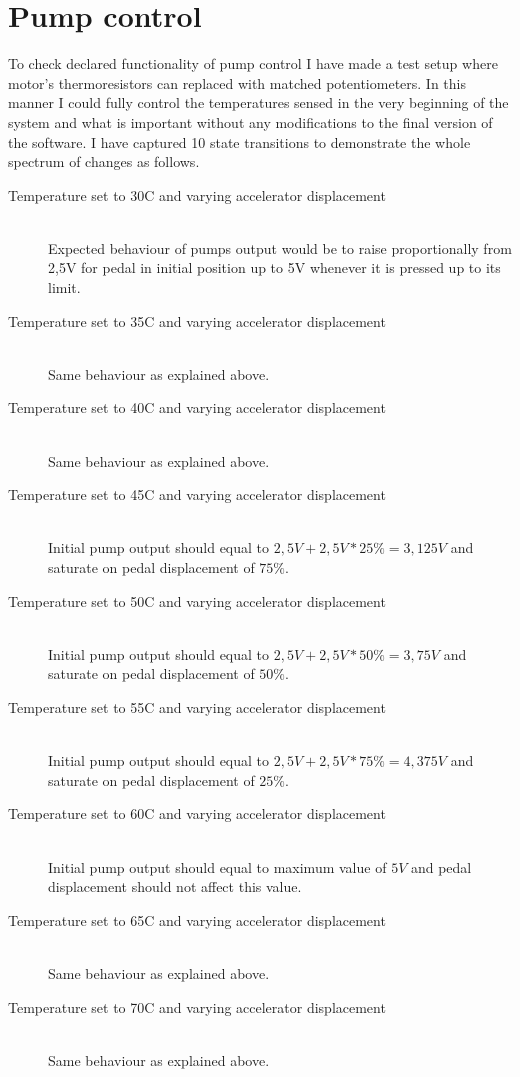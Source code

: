\section{Pump control}
To check declared functionality of pump control I have made a test setup where motor's thermoresistors can replaced with matched potentiometers. In this manner I could fully control the temperatures sensed in the very beginning of the system and what is important without any modifications to the final version of the software.
\newline
\newline
I have captured 10 state transitions to demonstrate the whole spectrum of changes as follows.
\begin{description}
    \item[Temperature set to 30\textdegree C and varying accelerator displacement] \hfill \\ Expected behaviour of pumps output would be to raise proportionally from 2,5V for pedal in initial position up to 5V whenever it is pressed up to its limit.
    \item[Temperature set to 35\textdegree C and varying accelerator displacement] \hfill \\ Same behaviour as explained above.
    \item[Temperature set to 40\textdegree C and varying accelerator displacement] \hfill \\ Same behaviour as explained above.
    \item[Temperature set to 45\textdegree C and varying accelerator displacement] \hfill \\ Initial pump output should equal to $2,5V + 2,5V*25\% = 3,125V$ and saturate on pedal displacement of $75\% $.
    \item[Temperature set to 50\textdegree C and varying accelerator displacement] \hfill \\ Initial pump output should equal to $2,5V + 2,5V*50\% = 3,75V$ and saturate on pedal displacement of $50\% $.
    \item[Temperature set to 55\textdegree C and varying accelerator displacement] \hfill \\ Initial pump output should equal to $2,5V + 2,5V*75\% = 4,375V$ and saturate on pedal displacement of $25\% $.
    \item[Temperature set to 60\textdegree C and varying accelerator displacement] \hfill \\ Initial pump output should equal to maximum value of $5V$ and pedal displacement should not affect this value.
    \item[Temperature set to 65\textdegree C and varying accelerator displacement] \hfill \\ Same behaviour as explained above.
    \item[Temperature set to 70\textdegree C and varying accelerator displacement] \hfill \\ Same behaviour as explained above.
\end{description}
